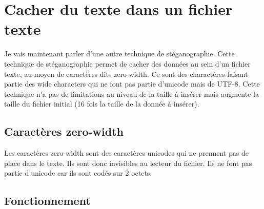 \newpage
\section{Cacher du texte dans un fichier texte}
Je vais maintenant parler d'une autre technique de stéganographie. Cette technique de stéganographie permet de cacher des données au sein d'un fichier texte, au moyen de caractères dits zero-width. Ce sont des charactères faisant partie des wide characters qui ne font pas partie d'unicode mais de UTF-8.
\newline
Cette technique n'a pas de limitations au niveau de la taille à insérer mais augmente la taille du fichier initial (16 fois la taille de la donnée à insérer).\cite{readWriteScript}
\subsection{Caractères zero-width}
Les caractères zero-width sont des caractères unicodes qui ne prennent pas de place dans le texte. Ils sont donc invisibles au lecteur du fichier. Ils ne font pas partie d'unicode car ils sont codés sur 2 octets.
\subsection{Fonctionnement}
